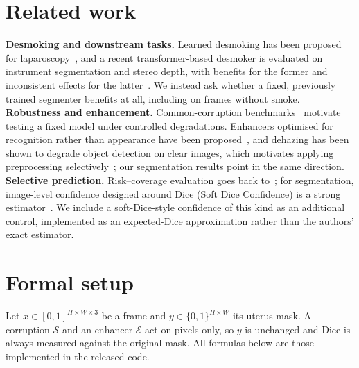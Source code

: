 \documentclass{midl}
\begin{document}
\section{Related work}
\textbf{Desmoking and downstream tasks.} Learned desmoking has been proposed for laparoscopy~\citep{pan2022desmoke}, and a recent transformer-based desmoker is evaluated on instrument segmentation and stereo depth, with benefits for the former and inconsistent effects for the latter~\citep{lu2026seeing}. We instead ask whether a fixed, previously trained segmenter benefits at all, including on frames without smoke. \textbf{Robustness and enhancement.} Common-corruption benchmarks~\citep{hendrycks2019corruptions} motivate testing a fixed model under controlled degradations. Enhancers optimised for recognition rather than appearance have been proposed~\citep{son2020urie}, and dehazing has been shown to degrade object detection on clear images, which motivates applying preprocessing selectively~\citep{kumar2025fog}; our segmentation results point in the same direction. 
\textbf{Selective prediction.} Risk--coverage evaluation goes back to~\citet{geifman2017selective}; for segmentation, image-level confidence designed around Dice (Soft Dice Confidence) is a strong estimator~\citep{borges2024sdc}. We include a soft-Dice-style confidence of this kind as an additional control, implemented as an expected-Dice approximation rather than the authors' exact estimator.

\section{Formal setup}
\label{sec:formal}
Let $x\in[0,1]^{H\times W\times 3}$ be a frame and $y\in\{0,1\}^{H\times W}$ its uterus mask. A corruption $\mathcal{S}$ and an enhancer $\mathcal{E}$ act on pixels only, so $y$ is unchanged and Dice is always measured against the original mask. All formulas below are those implemented in the released code.
\end{document}
